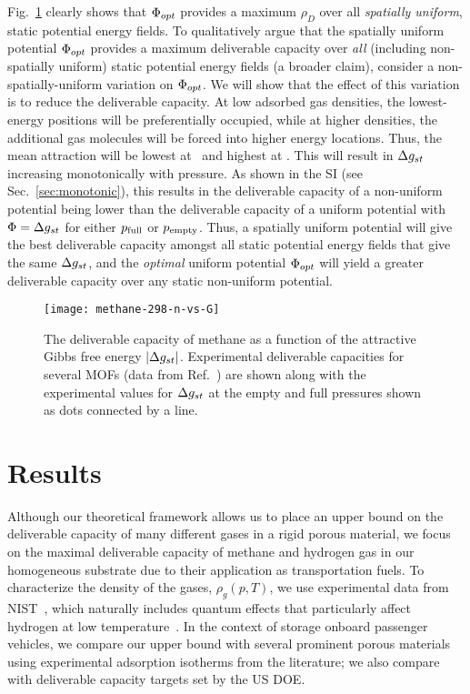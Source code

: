 Fig.~\ref{fig:methane-298-D} clearly shows that $\Phi_{opt}$ provides a maximum
$\rho_D$ over all \emph{spatially uniform}, static potential energy fields. To
qualitatively argue that the spatially uniform potential $\Phi_{opt}$ provides a
maximum deliverable capacity over \emph{all} (including non-spatially uniform)
static potential energy fields (a broader claim), consider a
non-spatially-uniform variation on $\Phi_{opt}$. We will show that the effect of
this variation is to reduce the deliverable capacity. At low adsorbed gas
densities, the lowest-energy positions will be preferentially occupied, while
at higher densities, the additional gas molecules will be forced into higher
energy locations. Thus, the mean attraction will be lowest at \pfull\ and
highest at \pempty. This will result in $\Delta g_{st}$ increasing monotonically with
pressure. As shown in the SI (see Sec.~\ref{sec:monotonic}), this results in
the deliverable capacity of a non-uniform potential being lower than the
deliverable capacity of a uniform potential with $\Phi=\Delta g_{st}$ for either $p_{\text{full}}$
or $p_{\text{empty}}$. Thus, a spatially uniform potential will give the best
deliverable capacity amongst all static potential energy fields that give the
same $\Delta g_{st}$, and the \emph{optimal} uniform potential $\Phi_{opt}$ will yield a
greater deliverable capacity over any static non-uniform potential.

\begin{figure}
    \centering
    \texttt{[image: methane-298-n-vs-G]}
    \caption{The deliverable capacity of methane as a function of the attractive Gibbs free energy $|\Delta g_{st}|$.
    Experimental deliverable capacities for several MOFs (data from Ref.~\cite{mason2014evaluating, furukawa2009storage}) are shown along with the experimental values for $\Delta g_{st}$ at the empty and full pressures shown as dots connected by a line.}
    \label{fig:methane-298-D}
\end{figure}

\section{Results}
Although our theoretical framework allows us to place an upper bound on the
deliverable capacity of many different gases in a rigid porous material, we
focus on the maximal deliverable capacity of methane and hydrogen gas in our
homogeneous substrate due to their application as transportation fuels. To
characterize the density of the gases, $\rho_g(p, T)$, we use experimental data
from NIST~\cite{nist}, which naturally includes quantum effects that
particularly affect hydrogen at low temperature~\cite{kumar2006quantum}. In the
context of storage onboard passenger vehicles, we compare our upper bound with
several prominent porous materials using experimental adsorption isotherms from
the literature; we also compare with deliverable capacity targets set by the US
DOE.

